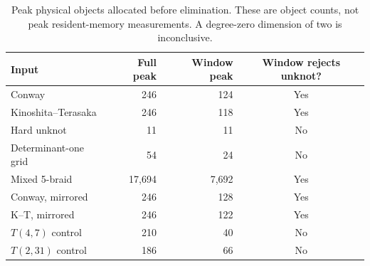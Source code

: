 \begin{table}[htbp]
\centering\small
\setlength{\tabcolsep}{4pt}
\begin{tabular}{lrrc}
\toprule
Input & Full peak & Window peak & Window rejects unknot? \\
\midrule
Conway & 246 & 124 & Yes \\
Kinoshita--Terasaka & 246 & 118 & Yes \\
Hard unknot & 11 & 11 & No \\
Determinant-one grid & 54 & 24 & No \\
Mixed 5-braid & 17,694 & 7,692 & Yes \\
Conway, mirrored & 246 & 128 & Yes \\
K--T, mirrored & 246 & 122 & Yes \\
$T(4,7)$ control & 210 & 40 & No \\
$T(2,31)$ control & 186 & 66 & No \\
\bottomrule
\end{tabular}
\caption{Peak physical objects allocated before elimination. These are object counts, not peak resident-memory measurements. A degree-zero dimension of two is inconclusive.}
\label{tab:window-objects}
\end{table}

